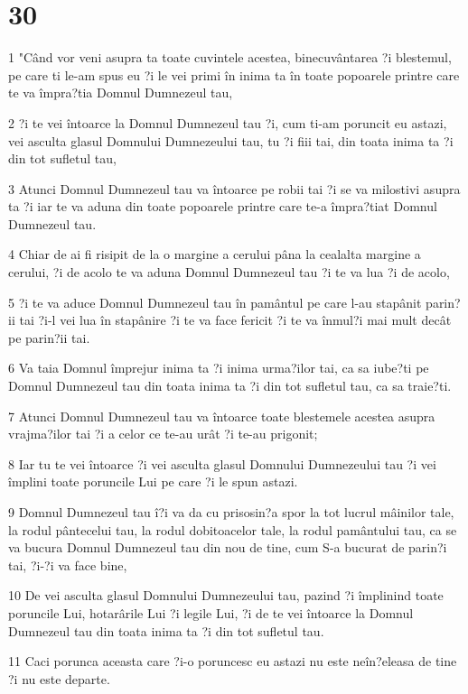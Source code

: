 \chapter{30}

\par 1 "Când vor veni asupra ta toate cuvintele acestea, binecuvântarea ?i blestemul, pe care ti le-am spus eu ?i le vei primi în inima ta în toate popoarele printre care te va împra?tia Domnul Dumnezeul tau,
\par 2 ?i te vei întoarce la Domnul Dumnezeul tau ?i, cum ti-am poruncit eu astazi, vei asculta glasul Domnului Dumnezeului tau, tu ?i fiii tai, din toata inima ta ?i din tot sufletul tau,
\par 3 Atunci Domnul Dumnezeul tau va întoarce pe robii tai ?i se va milostivi asupra ta ?i iar te va aduna din toate popoarele printre care te-a împra?tiat Domnul Dumnezeul tau.
\par 4 Chiar de ai fi risipit de la o margine a cerului pâna la cealalta margine a cerului, ?i de acolo te va aduna Domnul Dumnezeul tau ?i te va lua ?i de acolo,
\par 5 ?i te va aduce Domnul Dumnezeul tau în pamântul pe care l-au stapânit parin?ii tai ?i-l vei lua în stapânire ?i te va face fericit ?i te va înmul?i mai mult decât pe parin?ii tai.
\par 6 Va taia Domnul împrejur inima ta ?i inima urma?ilor tai, ca sa iube?ti pe Domnul Dumnezeul tau din toata inima ta ?i din tot sufletul tau, ca sa traie?ti.
\par 7 Atunci Domnul Dumnezeul tau va întoarce toate blestemele acestea asupra vrajma?ilor tai ?i a celor ce te-au urât ?i te-au prigonit;
\par 8 Iar tu te vei întoarce ?i vei asculta glasul Domnului Dumnezeului tau ?i vei împlini toate poruncile Lui pe care ?i le spun astazi.
\par 9 Domnul Dumnezeul tau î?i va da cu prisosin?a spor la tot lucrul mâinilor tale, la rodul pântecelui tau, la rodul dobitoacelor tale, la rodul pamântului tau, ca se va bucura Domnul Dumnezeul tau din nou de tine, cum S-a bucurat de parin?i tai, ?i-?i va face bine,
\par 10 De vei asculta glasul Domnului Dumnezeului tau, pazind ?i împlinind toate poruncile Lui, hotarârile Lui ?i legile Lui, ?i de te vei întoarce la Domnul Dumnezeul tau din toata inima ta ?i din tot sufletul tau.
\par 11 Caci porunca aceasta care ?i-o poruncesc eu astazi nu este neîn?eleasa de tine ?i nu este departe.
